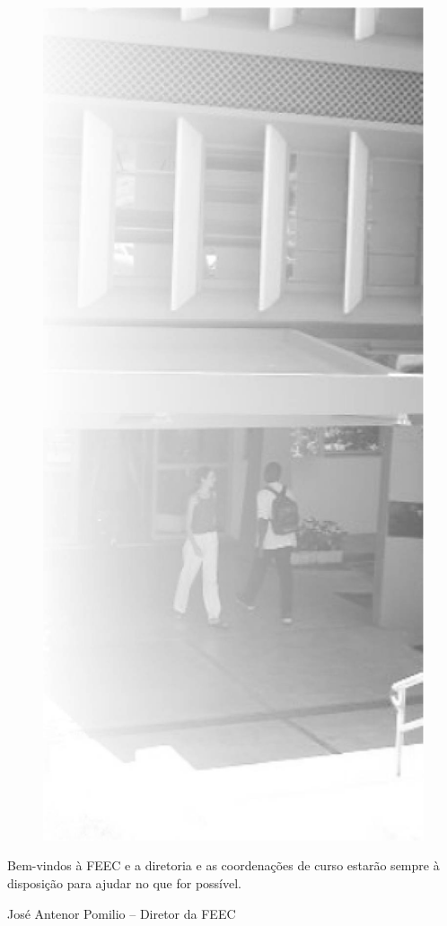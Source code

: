 \begin{figure}
    \includegraphics[scale=0.30, keepaspectratio=true]{img/imgs/3-feec/feec.jpg}
\end{figure}

Bem-vindos à FEEC e a diretoria e as coordenações de curso estarão sempre à disposição para ajudar no que for possível.
 
José Antenor Pomilio -- Diretor da FEEC